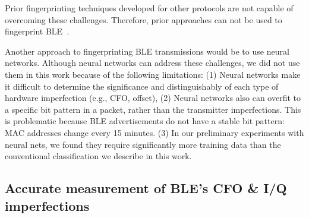 Prior fingerprinting techniques developed for other protocols are not capable of overcoming these challenges.
Therefore, prior approaches can not be used to fingerprint BLE~\cite{vohuuusrp,Brik_radiometric,deviceID_kose,Intrusion_hall,suskitransient,deeplearning_merchant,lora_robyns,gopalakrishnan2019robust}.

Another approach to fingerprinting BLE transmissions would be to use neural networks. 
Although neural networks can address these challenges, we did not use them in
this work because of the following limitations: (1) 
Neural networks make it difficult to determine
the significance and distinguishably of each type of hardware imperfection
(e.g., CFO, \iq offset), (2) Neural networks also can overfit to a specific
bit pattern in a packet, rather than the transmitter imperfections. This is problematic because
BLE advertisements do not have a stable bit pattern: MAC addresses change every
15 minutes.  (3) In our preliminary experiments with neural nets, 
we found they require significantly more training data than the conventional
classification we describe in this work.

\subsection{Accurate measurement of BLE's CFO \& I/Q imperfections} %
\label{sec:methodology1}



%
% 





